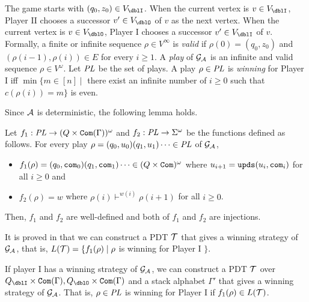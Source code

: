 The game starts with $(q_0,z_0)\in V_\dblI$.
When the current vertex is $v\in V_\dblI$,
Player II chooses a successor $v'\in V_\dblO$ of $v$ as the next vertex.
When the current vertex is $v\in V_\dblO$,
Player I chooses a successor $v'\in V_\dblI$ of $v$.
Formally, a finite or infinite sequence $\rho\in V^\infty$ is
\emph{valid} if
$\rho(0)=(q_0,z_0)$ and
$(\rho(i-1), \rho(i))\in E$ for every $i\geq 1$.
A \emph{play} of ${\cal G}_{\cal A}$ is an infinite and valid sequence $\rho\in V^\omega$.
Let $\mathit{PL}$ be the set of plays.
A play $\rho\in \mathit{PL}$ is \emph{winning} for Player I iff
$\min\{m\in[n] \mid $ there exist an infinite
number of $i\geq 0$ such that $c(\rho(i)) = m\}$ is even.

Since ${\cal A}$ is deterministic,
the following lemma holds.
\begin{lemma}
\label{lem: cor}
Let $f_1: \mathit{PL}\to(Q\times\mathtt{Com}(\Gamma))^\omega$ and
$f_2: \mathit{PL}\to\Sigma^\omega$ be the functions defined as follows.
For every play
$\rho=(q_0,u_0)(q_1,u_1)\cdots\in \mathit{PL}$ of ${\cal G}_{\cal A}$,
\begin{itemize}
\item $f_1(\rho)=(q_0,\mathtt{com}_0)(q_1,\mathtt{com}_1)\cdots\in (Q\times\mathtt{Com})^\omega$ where
$u_{i+1} = \mathtt{upds}(u_{i},\mathtt{com}_i)$
for all $i\geq 0$ and
\item $f_2(\rho)=w$ where $\rho(i)\vdash^{w(i)} \rho(i+1)$
for all $i\geq 0$.
\end{itemize}
Then, $f_1$ and $f_2$ are well-defined and both of $f_1$ and $f_2$ are injections.
\end{lemma}
It is proved in \cite{Wa96} that
we can construct a PDT ${\cal T}$
that gives a winning strategy of ${\cal G}_{\cal A}$,
that is, $L({\cal T}) = \{ f_1(\rho) \mid
\rho$ is winning for Player I $\}$.
\begin{theorem}{\cite{Wa96}}
\label{the: wal}
If player I has a winning strategy of ${\cal G}_{\cal A}$,
we can construct a PDT ${\cal T}$ over $Q_\dblI\times\Com(\Gamma), Q_\dblO\times\Com(\Gamma)$ and a stack alphabet $\Gamma'$ that gives a winning strategy of ${\cal G}_{\cal A}$.
That is, $\rho\in \mathit{PL}$ is winning for Player I if $f_1(\rho)\in L({\cal T})$.
\end{theorem}

